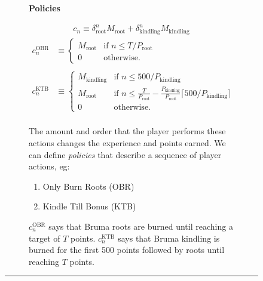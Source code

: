 \documentclass[]{article}
\newcommand{\lcol}{0.15}
\newcommand{\ccol}{0.55}
\newcommand{\rcol}{0.25}
\newcommand{\textsize}{\large}
\begin{document}
\begin{figure}[b]
		\begin{subfigure}{\lcol\linewidth}
		    \centering
		    \LARGE{\textbf{Policies}}
		\end{subfigure}%
		\textsize
		\begin{subfigure}{\ccol\linewidth}
		    \begin{gather*}
		       	c_n \equiv \delta_\text{root}^n M_\text{root} + \delta_\text{kindling}^n M_\text{kindling}
		    \end{gather*}
		    \begin{align*}
		    c_n^\text{OBR} &\equiv \begin{cases}
						M_\text{root} & \text{if } n \le T/P_\text{root}\\
						0 & \text{otherwise}.
				\end{cases}\\\\
		    c_n^\text{KTB} &\equiv \begin{cases}
					M_\text{kindling} &\text{if } n \le 500/P_\text{kindling}\\
					M_\text{root} &\text{if } n \le \frac{T}{P_\text{root}} - \frac{P_\text{kindling}}{P_\text{root}}\lceil 500/P_\text{kindling} \rceil \\
					0 & \text{otherwise}.
				\end{cases}\\
			\end{align*}
		\end{subfigure}%
		\begin{subfigure}{\rcol\linewidth}
			\vspace{5mm}
		    The amount and order that the player performs these actions changes the experience and points earned. We can define \textit{policies} that describe a sequence of player actions, eg:
		    \begin{enumerate}
		    	\item Only Burn Roots (OBR)
		    	\item Kindle Till Bonus (KTB)
		    \end{enumerate}
		    $c^\text{OBR}_n$ says that Bruma roots are burned until reaching a target of $T$ points. $c_n^\text{KTB}$ says that Bruma kindling is burned for the first 500 points followed by roots until reaching $T$ points.
		    \vspace{5mm}
		\end{subfigure}

		\hrule


\end{figure}
\end{document}
